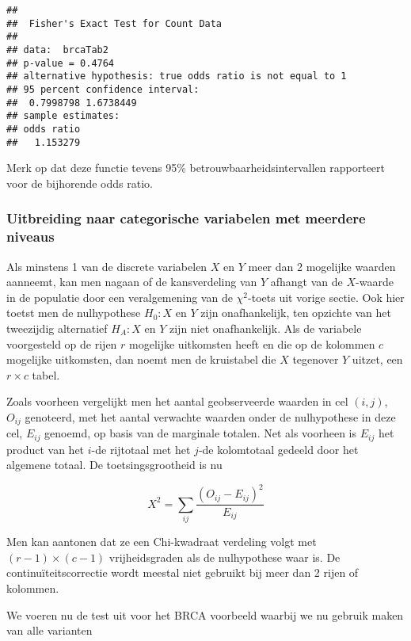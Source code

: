 \documentclass[12pt,dutch,coursenotes]{book}
\theoremstyle{definition}
\theoremstyle{definition}
\theoremstyle{definition}
\theoremstyle{remark}
\begin{document}
\begin{verbatim}
## 
##  Fisher's Exact Test for Count Data
## 
## data:  brcaTab2
## p-value = 0.4764
## alternative hypothesis: true odds ratio is not equal to 1
## 95 percent confidence interval:
##  0.7998798 1.6738449
## sample estimates:
## odds ratio 
##   1.153279
\end{verbatim}

Merk op dat deze functie tevens 95\% betrouwbaarheidsintervallen
rapporteert voor de bijhorende odds ratio.

\subsubsection{Uitbreiding naar categorische variabelen met meerdere
niveaus}\label{uitbreiding-naar-categorische-variabelen-met-meerdere-niveaus}

Als minstens 1 van de discrete variabelen \(X\) en \(Y\) meer dan 2
mogelijke waarden aanneemt, kan men nagaan of de kansverdeling van \(Y\)
afhangt van de \(X\)-waarde in de populatie door een veralgemening van
de \(\chi^2\)-toets uit vorige sectie. Ook hier toetst men de
nulhypothese \(H_0: X\) en \(Y\) zijn onafhankelijk, ten opzichte van
het tweezijdig alternatief \(H_A: X\) en \(Y\) zijn niet onafhankelijk.
Als de variabele voorgesteld op de rijen \(r\) mogelijke uitkomsten
heeft en die op de kolommen \(c\) mogelijke uitkomsten, dan noemt men de
kruistabel die \(X\) tegenover \(Y\) uitzet, een \(r \times c\) tabel.

Zoals voorheen vergelijkt men het aantal geobserveerde waarden in cel
\((i,j)\), \(O_{ij}\) genoteerd, met het aantal verwachte waarden onder
de nulhypothese in deze cel, \(E_{ij}\) genoemd, op basis van de
marginale totalen. Net als voorheen is \(E_{ij}\) het product van het
\(i\)-de rijtotaal met het \(j\)-de kolomtotaal gedeeld door het
algemene totaal. De toetsingsgrootheid is nu

\begin{equation*}
X^2 = \sum_{ij} \frac{\left (O_{ij} - E_{ij}\right)^2 }{ E_{ij}} 
\end{equation*}

Men kan aantonen dat ze een Chi-kwadraat verdeling volgt met
\((r-1) \times (c-1)\) vrijheidsgraden als de nulhypothese waar is. De
continuïteitscorrectie wordt meestal niet gebruikt bij meer dan 2 rijen
of kolommen.

We voeren nu de test uit voor het BRCA voorbeeld waarbij we nu gebruik
maken van alle varianten
\end{document}
